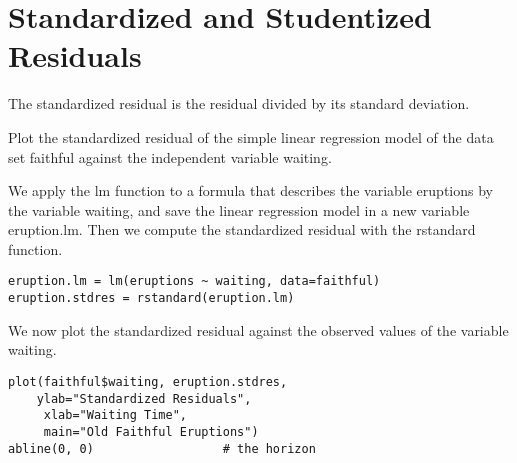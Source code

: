 \documentclass[residuals.tex]{subfiles}
\begin{document}
\section{Standardized and Studentized Residuals}
The standardized residual is the residual divided by its standard deviation. 
 
Plot the standardized residual of the simple linear regression model of the data set faithful against the independent variable waiting.

We apply the lm function to a formula that describes the variable eruptions by the variable waiting, and save the linear regression model in a new variable eruption.lm. Then we compute the standardized residual with the rstandard function.

\begin{framed}
\begin{verbatim}
eruption.lm = lm(eruptions ~ waiting, data=faithful) 
eruption.stdres = rstandard(eruption.lm) 
\end{verbatim}
\end{framed}
We now plot the standardized residual against the observed values of the variable waiting.
\begin{framed}
\begin{verbatim}
plot(faithful$waiting, eruption.stdres, 
    ylab="Standardized Residuals", 
     xlab="Waiting Time", 
     main="Old Faithful Eruptions") 
abline(0, 0)                  # the horizon
\end{verbatim}
\end{framed}
\end{document}
